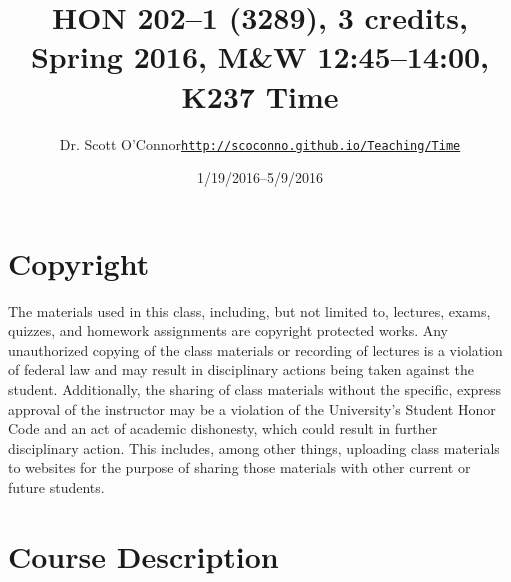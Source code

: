 \documentclass[article,oneside]{memoir}
\def\myauthor{Author}
\def\mytitle{Title}
\def\mycopyright{\myauthor}
\def\myweb{\href{http://scoconno.github.io/Teaching/Time}{http://scoconno.github.io/Teaching/Time}}
\def\myauthor{Dr. Scott O'Connor}
\def\mytitle{{\normalsize HON 202--1 (3289), 3 credits, Spring 2016, M\&W 12:45--14:00, K237 \newline} \HUGE Time}
\begin{document}
\setsansfont[Mapping=tex-text]{Myriad Pro} 
\setmonofont[Mapping=tex-text,Scale=0.8]{Georgia} 

\def\ind{\hangindent=1 true cm\hangafter=1 \noindent}
\def\labelitemi{$\cdot$}


\title{\LARGE \mytitle}     
\author{\Large\myauthor \newline \footnotesize\texttt{\noindent\myweb}}
\date{1/19/2016--5/9/2016}


\maketitle




%
%

\section{Copyright}
The materials used in this class, including, but not limited to, lectures, exams, quizzes, and homework assignments are copyright protected works.  Any unauthorized copying of the class materials or recording of lectures is a violation of federal law and may result in disciplinary actions being taken against the student.  Additionally, the sharing of class materials without the specific, express approval of the instructor may be a violation of the University's Student Honor Code and an act of academic dishonesty, which could result in further disciplinary action.  This includes, among other things, uploading class materials to websites for the purpose of sharing those materials with other current or future students. 



\section{Course Description}
\end{document}
